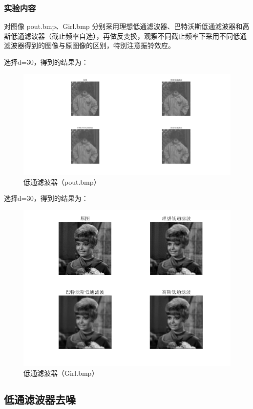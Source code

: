 \documentclass{ctexart}
\begin{document}
\subsubsection{\hei 实验内容}
对图像 pout.bmp、Girl.bmp 分别采用理想低通滤波器、巴特沃斯低通滤波器和高
斯低通滤波器（截止频率自选），再做反变换，观察不同截止频率下采用不同低通
滤波器得到的图像与原图像的区别，特别注意振铃效应。
\par 选择d=30，得到的结果为：
\begin{figure}[H]
    \centering
    \includegraphics[scale=0.35]{4_5_1.png}
    \caption{低通滤波器（pout.bmp）}
\end{figure}
\par 选择d=30，得到的结果为：
\begin{figure}[H]
    \centering
    \includegraphics[scale=0.6]{4_5_2.png}
    \caption{低通滤波器（Girl.bmp）}
\end{figure}
\subsection{\hei 低通滤波器去噪}
\end{document}
